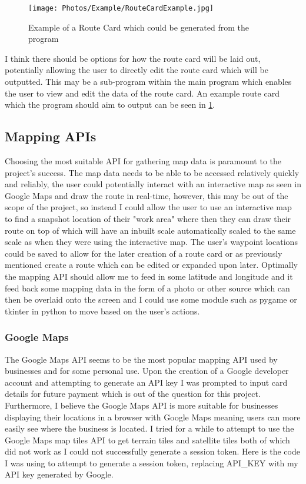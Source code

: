 \documentclass{article}
\begin{document}
        \begin{figure}[ht]
            \centering
            \texttt{[image: Photos/Example/RouteCardExample.jpg]}
            \caption{Example of a Route Card which could be generated from the program}
            \label{fig:example_route_card}
         \end{figure}
         
         I think there should be options for how the route card will be laid out, potentially allowing the user to directly edit the route card which will be outputted. This may be a sub-program within the main program which enables the user to view and edit the data of the route card. An example route card which the program should aim to output can be seen in \cref{fig:example_route_card}.

    \subsection{Mapping APIs}

        Choosing the most suitable API for gathering map data is paramount to the project's success. The map data needs to be able to be accessed relatively quickly and reliably, the user could potentially interact with an interactive map as seen in Google Maps and draw the route in real-time, however, this may be out of the scope of the project, so instead I could allow the user to use an interactive map to find a snapshot location of their "work area" where then they can draw their route on top of which will have an inbuilt scale automatically scaled to the same scale as when they were using the interactive map. The user's waypoint locations could be saved to allow for the later creation of a route card or as previously mentioned create a route which can be edited or expanded upon later. Optimally the mapping API should allow me to feed in some latitude and longitude and it feed back some mapping data in the form of a photo or other source which can then be overlaid onto the screen and I could use some module such as pygame or tkinter in python to move based on the user's actions.

        \subsubsection{Google Maps}

            The Google Maps API seems to be the most popular mapping API used by businesses and for some personal use. Upon the creation of a Google developer account and attempting to generate an API key I was prompted to input card details for future payment which is out of the question for this project. Furthermore, I believe the Google Maps API is more suitable for businesses displaying their locations in a browser with Google Maps meaning users can more easily see where the business is located. I tried for a while to attempt to use the Google Maps map tiles API to get terrain tiles and satellite tiles both of which did not work as I could not successfully generate a session token. Here is the code I was using to attempt to generate a session token, replacing API\_KEY with my API key generated by Google.
\end{document}
